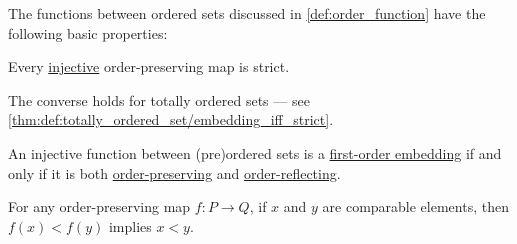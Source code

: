\begin{proposition}\label{thm:def:order_function}
  The functions between ordered sets discussed in \cref{def:order_function} have the following basic properties:
  \begin{thmenum}
     Every \hyperref[def:function_invertibility/injective]{injective} order-preserving map is strict.

    The converse holds for totally ordered sets --- see \cref{thm:def:totally_ordered_set/embedding_iff_strict}.

     An injective function between (pre)ordered sets is a \hyperref[def:fol_embedding]{first-order embedding} if and only if it is both \hyperref[def:order_function/preserving]{order-preserving} and \hyperref[def:order_function/preserving]{order-reflecting}.

     For any order-preserving map \( f: P \to Q \), if \( x \) and \( y \) are comparable elements, then \( f(x) < f(y) \) implies \( x < y \).
  \end{thmenum}
\end{proposition}
